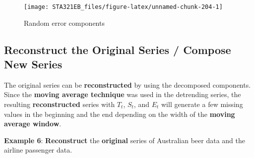 \documentclass[
]{book}
\begin{document}
\begin{figure}

{\centering \texttt{[image: STA321EB\_files/figure-latex/unnamed-chunk-204-1]} 

}

\caption{Random error components}\label{fig:unnamed-chunk-204}
\end{figure}

\hypertarget{reconstruct-the-original-series-compose-new-series}{%
\subsection{Reconstruct the Original Series / Compose New Series}\label{reconstruct-the-original-series-compose-new-series}}

The original series can be \textbf{reconstructed} by using the decomposed components. Since the \textbf{moving average technique} was used in the detrending series, the resulting \textbf{reconstructed} series with \(T_t\), \(S_t\), and \(E_t\) will generate a few missing values in the beginning and the end depending on the width of the \textbf{moving average window}.

\textbf{Example 6}: \textbf{Reconstruct} the \textbf{original} series of Australian beer data and the airline passenger data.
\end{document}

